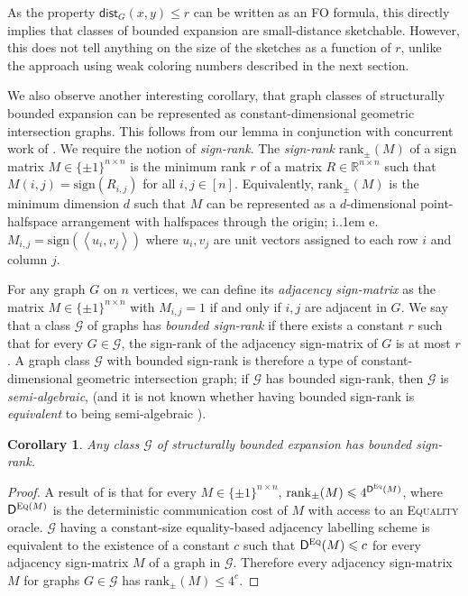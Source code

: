 \documentclass[11pt]{article}
\newcommand*\ie{i.\kern.1em e.\ }
\newtheorem{corollary}[thm]{Corollary}
\theoremstyle{definition}
\newcommand{\G}{\mathcal{G}}
\newcommand{\R}{\mathbb{R}}
\renewcommand{\le}{\leqslant}
\renewcommand{\leq}{\leqslant}
\def\G {{\mathcal G}}
\newcommand{\dist}{\mathsf{dist}}
\begin{document}
As the property $\dist_G(x,y)\le r$ can be written as an FO formula, this
directly implies that classes of bounded expansion are small-distance
sketchable.  However, this does not tell anything on the size of the
sketches as a function of $r$, unlike the approach using weak coloring
numbers described in the next section.


\newcommand{\sign}{\mathrm{sign}}
\newcommand{\rank}{\mathrm{rank}}
\newcommand{\inn}[1]{\left\langle #1 \right\rangle}
We also observe another interesting corollary, that graph classes of structurally bounded expansion
can be represented as constant-dimensional geometric intersection graphs. This follows from our
lemma in conjunction with concurrent work of \cite{HHP+22}. We require the notion of
\emph{sign-rank}. The \emph{sign-rank} $\mathrm{rank}_\pm(M)$ of a sign matrix $M \in \{\pm 1\}^{n
\times n}$ is the minimum rank $r$ of a matrix $R \in \R^{n \times n}$ such that $M(i,j) =
\mathrm{sign}(R_{i,j})$ for all $i,j \in [n]$.  Equivalently, $\mathrm{rank}_\pm(M)$ is the minimum
dimension $d$ such that $M$ can be represented as a $d$-dimensional point-halfspace arrangement with
halfspaces through the origin; \ie $M_{i,j} = \sign(\inn{u_i, v_j})$ where $u_i, v_j$ are unit
vectors assigned to each row $i$ and column $j$.

For any graph $G$ on $n$ vertices, we can define its \emph{adjacency sign-matrix} as the matrix $M
\in \{\pm 1\}^{n \times n}$ with $M_{i,j} = 1$ if and only if $i,j$ are adjacent in $G$. We say that
a class $\G$ of graphs has \emph{bounded sign-rank} if there exists a constant $r$ such that for
every $G \in \G$, the sign-rank of the adjacency sign-matrix of $G$ is at most $r$. A graph class
$\G$ with bounded sign-rank is therefore a type of constant-dimensional geometric intersection
graph; if $\G$ has bounded sign-rank, then $\G$ is \emph{semi-algebraic}, (and it is not known
whether having bounded sign-rank is \emph{equivalent} to being semi-algebraic \cite{HHP+22}).

\begin{corollary}
\label{cor:sign-rank}
Any class $\mathcal{G}$ of structurally bounded expansion has bounded sign-rank.
\end{corollary}
\begin{proof}
A result of \cite{HHP+22} is that for every $M \in \{\pm 1\}^{n \times n}$, $\rank_\pm(M) \leq
4^{\mathsf{D}^{\textsc{Eq}}(M)}$, where $\mathsf{D}^{\textsc{Eq}(M)}$ is the deterministic
communication cost of $M$ with access to an \textsc{Equality} oracle. $\G$ having a
constant-size equality-based adjacency labelling scheme is equivalent to the existence of a constant $c$
such that $\mathsf{D}^{\textsc{Eq}}(M) \leq c$ for every adjacency sign-matrix $M$ of a graph in
$\G$. Therefore every adjacency sign-matrix $M$ for graphs $G \in \G$ has $\rank_\pm(M) \leq 4^c$.
\end{proof}
\end{document}
